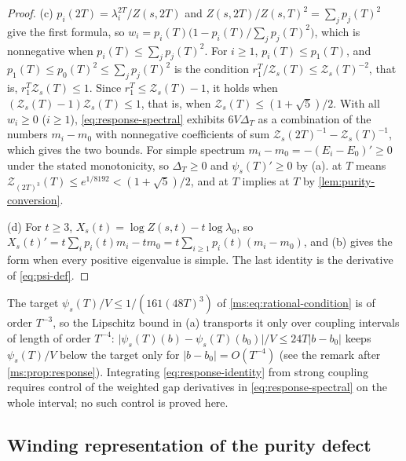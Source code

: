 \documentclass[11pt,a4paper]{amsart}
\theoremstyle{definition}
\theoremstyle{remark}
\numberwithin{equation}{section}
\newcommand{\abs}[1]{\lvert #1\rvert}      %
\newcommand{\TT}{\mathbb{T}}               %
\newcommand{\Zpart}[2]{Z(#1,#2)}           %
\newcommand{\Zc}{\mathcal{Z}}              %
\newcommand{\Zs}[2]{\Zc_{#1}(#2)}          %
\newcommand{\XT}[2]{X_{#1}(#2)}            %
\newcommand{\psiT}[2]{\psi_{#1}(#2)}       %
\newcommand{\cube}[1]{(2#1)^3}             %
\newcommand{\lzero}{\lambda_0}             %
\newcommand{\xconst}{\frac{1}{8192}}       %
\newcommand{\xconstinl}{1/8192}            %
\newcommand{\Mcirc}{\text{\upshape(M$^{\circ}$)}}   %
\newcommand{\Bcirc}{\text{\upshape(B$^{\circ}$)}}   %
\begin{document}
\begin{proof}
(c) $p_i(2T)=\lambda_i^{2T}/\Zpart{s}{2T}$ and $\Zpart{s}{2T}/\Zpart{s}{T}^2=\sum_jp_j(T)^2$ give the first formula, so $w_i=p_i(T)\bigl(1-p_i(T)/\sum_jp_j(T)^2\bigr)$, which is nonnegative when $p_i(T)\le\sum_jp_j(T)^2$. For $i\ge1$, $p_i(T)\le p_1(T)$, and $p_1(T)\le p_0(T)^2\le\sum_jp_j(T)^2$ is the condition $r_1^T/\Zs{s}{T}\le\Zs{s}{T}^{-2}$, that is, $r_1^T\Zs{s}{T}\le1$. Since $r_1^T\le\Zs{s}{T}-1$, it holds when $(\Zs{s}{T}-1)\Zs{s}{T}\le1$, that is, when $\Zs{s}{T}\le(1+\sqrt5)/2$. With all $w_i\ge0$ ($i\ge1$), \eqref{eq:response-spectral} exhibits $6V\Delta_T$ as a combination of the numbers $m_i-m_0$ with nonnegative coefficients of sum $\Zs{s}{2T}^{-1}-\Zs{s}{T}^{-1}$, which gives the two bounds. For simple spectrum $m_i-m_0=-(E_i-E_0)'\ge0$ under the stated monotonicity, so $\Delta_T\ge0$ and $\psiT{s}{T}'\ge0$ by (a). \Bcirc{} at $T$ means $\Zs{\cube{T}}{T}\le e^{\xconstinl}<(1+\sqrt5)/2$, and \Mcirc{} at $T$ implies \Bcirc{} at $T$ by \cref{lem:purity-conversion}.

(d) For $t\ge3$, $\XT{s}{t}=\log\Zpart{s}{t}-t\log\lzero$, so $\XT{s}{t}'=t\sum_ip_i(t)m_i-tm_0=t\sum_{i\ge1}p_i(t)(m_i-m_0)$, and (b) gives the form when every positive eigenvalue is simple. The last identity is the derivative of \eqref{eq:psi-def}.
\end{proof}

The target $\psiT{s}{T}/V\le1/(161(48T)^3)$ of \eqref{ms:eq:rational-condition} is of order $T^{-3}$, so the Lipschitz bound in (a) transports it only over coupling intervals of length of order $T^{-4}$: $\abs{\psiT{s}{T}(b)-\psiT{s}{T}(b_0)}/V\le24T\abs{b-b_0}$ keeps $\psiT{s}{T}/V$ below the target only for $\abs{b-b_0}=O(T^{-4})$ (see the remark after \cref{ms:prop:response}). Integrating \eqref{eq:response-identity} from strong coupling requires control of the weighted gap derivatives in \eqref{eq:response-spectral} on the whole interval; no such control is proved here.

\subsection{Winding representation of the purity defect}
\end{document}
